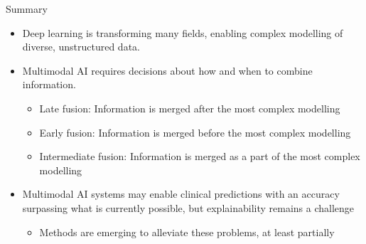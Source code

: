 \begin{frame}{Summary}
    \begin{itemize}
        \item Deep learning is transforming many fields, enabling complex modelling of diverse, unstructured data.
        \item Multimodal AI requires decisions about how and when to combine information.
        \begin{itemize}
            \item Late fusion: Information is merged after the most complex modelling
            \item Early fusion: Information is merged before the most complex modelling
            \item Intermediate fusion: Information is merged as a part of the most complex modelling
        \end{itemize}
        \item Multimodal AI systems may enable clinical predictions with an accuracy surpassing what is currently possible, but explainability remains a challenge
        \begin{itemize}
            \item Methods are emerging to alleviate these problems, at least partially
        \end{itemize}
    \end{itemize}
\end{frame}